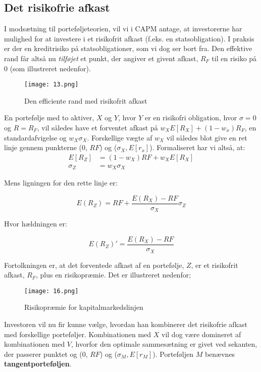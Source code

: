 \documentclass[10pt,reqno, usenames]{article}
\begin{document}
\subsection{Det risikofrie afkast}
I modsætning til porteføljeteorien, vil vi i CAPM antage, at investorerne har mulighed for at investere i et risikofrit afkast (f.eks. en statsobligation). I praksis er der en kreditrisiko på statsobligationer, som vi dog ser bort fra. Den effektive rand får altså nu \textit{tilføjet} et punkt, der angiver et givent afkast, $R_F$ til en risiko på 0 (som illustreret nedenfor). 

\begin{figure}[h]
     \centering
     \texttt{[image: 13.png]}
     \caption{Den efficiente rand med risikofrit afkast}
     \label{Figur 2}
\end{figure} 

En portefølje med to aktiver, $X$ og $Y$, hvor $Y$ er en risikofri obligation, hvor $\sigma = 0$ og $R=R_F$, vil således have et forventet afkast på $w_X E[R_X] + (1-w_x) R_F$, en standardafvigelse og $w_X \sigma_X$. Forskellige vægte af $w_X$ vil således blot give en ret linje gennem punkterne (0, $RF$) og ($\sigma_X, E[r_x]$). Formaliseret har vi altså, at: 
\begin{align*}
     E[R_Z] &= (1 - w_X) RF + w_X E[R_X] \\
     \sigma_Z &= w_X \sigma_X 
\end{align*}

Mens ligningen for den rette linje er: 

    \begin{equation}
    E(R_Z) = RF + \frac{E(R_X) - RF}{\sigma_X} \sigma_Z
    \end{equation}

Hvor hældningen er: 

 \begin{equation}
    E(R_Z)' =  \frac{E(R_X) - RF}{\sigma_X} 
    \end{equation}

Fortolkningen er, at det forventede afkast af en portefølje, $Z$, er et risikofrit afkast, $R_F$, plus en risikopræmie. Det er illustreret nedenfor; 

\begin{figure}[h]
     \centering
     \texttt{[image: 16.png]}
     \caption{Risikopræmie for kapitalmarkedslinjen}
     \label{Figur 2}
\end{figure} 

Investoren vil nu fir kunne vælge, hvordan han kombinerer det risikofrie afkast med forskellige porteføljer. Kombinationen med $X$ vil dog være domineret af kombinationen med $V$, hvorfor den optimale sammesætning er givet ved sekanten, der passerer punktet  og (0, $RF$) og ($\sigma_M, E[r_M]$). Porteføljen $M$ benævnes \textbf{tangentporteføljen}.
\end{document}
